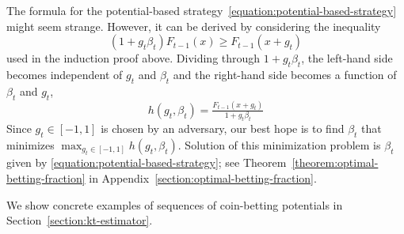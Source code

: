 The formula for the potential-based
strategy~\eqref{equation:potential-based-strategy} might seem strange. However,
it can be derived by considering the inequality
$$
(1+g_t\beta_t) F_{t-1}(x) \ge F_{t-1}(x + g_t)
$$
used in the induction proof above. Dividing through $1+g_t\beta_t$, the left-hand
side becomes independent of $g_t$ and $\beta_t$ and the right-hand side becomes
a function of $\beta_t$ and $g_t$,
$$
h(g_t, \beta_t) = \tfrac{F_{t-1}(x + g_t)}{1 + g_t\beta_t}
$$
Since $g_t \in [-1,1]$ is chosen by an adversary, our best hope is to find
$\beta_t$ that minimizes $\max_{g_t \in [-1,1]} h(g_t,\beta_t)$. Solution of
this minimization problem is $\beta_t$ given by
\eqref{equation:potential-based-strategy}; see
Theorem~\ref{theorem:optimal-betting-fraction} in
Appendix~\ref{section:optimal-betting-fraction}.

We show concrete examples of sequences of coin-betting potentials in
Section~\ref{section:kt-estimator}.
